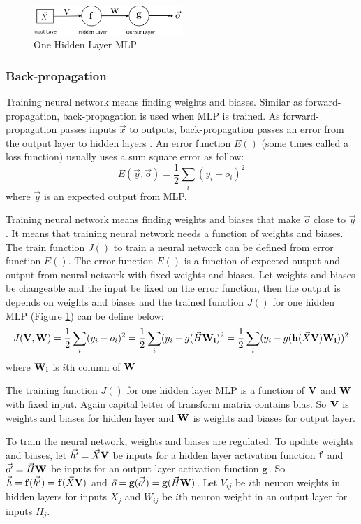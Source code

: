 \documentclass[draft,dvipsnames]{drexel-thesis}
\begin{document}
\begin{thesis}
\begin{figure}[t!]
    \centering
    \includegraphics[width=0.5\textwidth]{pictures/figures/MLP.png}
    \caption{One Hidden Layer MLP}
    \label{fig:MLP}
\end{figure}


\subsubsection{Back-propagation}\label{subsubsec:BP}
Training neural network means finding weights and biases. Similar as forward-propagation, back-propagation is used when MLP is trained. As forward-propagation passes inputs $\vec{x}$ to outputs, back-propagation passes an error from the output layer to hidden layers \cite{murphy2012machine}. An error function $E()$ (some times called a loss function) usually uses a sum square error as follow:
$$E(\vec{y}, \vec{o}) = \frac{1}{2}\sum_{i}(y_i-o_i)^2$$
where $\vec{y}$ is an expected output from MLP.

Training neural network means finding weights and biases that make $\vec{o}$ close to $\vec{y}$. It means that training neural network needs a function of weights and biases. The train function $J()$ to train a neural network can be defined from error function $E()$. The error function $E()$ is a function of expected output and output from neural network with fixed weights and biases. Let weights and biases be changeable and the input be fixed on the error function, then the output is depends on weights and biases and the trained function $J()$ for one hidden MLP (Figure \ref{fig:MLP}) can be define below:
$$J(\bold{V}, \bold{W}) = \frac{1}{2}\sum_{i}(y_i-o_i)^2 = \frac{1}{2}\sum_{i}(y_i-g(\vec{H}\bold{W_i})^2 =\frac{1}{2}\sum_{i}(y_i-g(\bold{h}(\vec{X}\bold{V})\bold{W_i}))^2$$
where $\bold{W_i}$ is $i$th column of $\bold{W}$

The training function $J()$ for one hidden layer MLP is a function of $\bold{V}$ and $\bold{W}$ with fixed input. Again capital letter of transform matrix contains bias. So $\bold{V}$ is weights and biases for hidden layer and $\bold{W}$ is weights and biases for output layer.

To train the neural network, weights and biases are regulated. To update weights and biases, let $\vec{h'}=\vec{X}\bold{V}$ be inputs for a hidden layer activation function $\bold{f}$ and $\vec{o'}=\vec{H}\bold{W}$ be inputs for an output layer activation function $\bold{g}$. So $\vec{h}=\bold{f}(\vec{h'})=\bold{f}(\vec{X}\bold{V})$ and $\vec{o}=\bold{g}(\vec{o'})=\bold{g}(\vec{H}\bold{W})$. Let $V_{ij}$ be $i$th neuron weights in hidden layers for inputs  $X_j$ and $W_{ij}$ be $i$th neuron weight in an output layer for inputs $H_j$.


\end{thesis}
\end{document}
